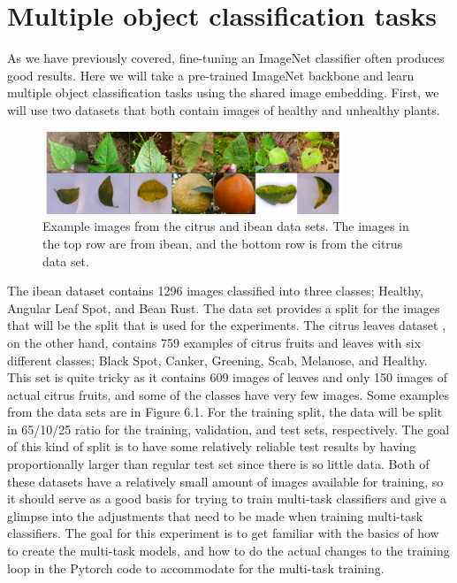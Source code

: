 \section{Multiple object classification tasks}
As we have previously covered, fine-tuning an ImageNet classifier often produces good results. 
Here we will take a pre-trained ImageNet backbone and learn multiple object classification tasks using the shared image embedding.
First, we will use two datasets that both contain images of healthy and unhealthy plants.

\begin{figure}[h!]
    \centering
    \includegraphics[width=0.8\textwidth]{imgs/citrus_beans_examples.png}
    \caption{Example images from the citrus and ibean data sets.
    The images in the top row are from ibean, and the bottom row is from the citrus data set.}
\end{figure}

The ibean dataset \citep{beansdata} contains 1296 images classified into three classes; Healthy, Angular Leaf Spot, and Bean Rust.
The data set provides a split for the images that will be the split that is used for the experiments.
The citrus leaves dataset \citep{citrusdata}, on the other hand, contains 759 examples of citrus fruits and leaves with six different classes; Black Spot, Canker, Greening, Scab, Melanose, and Healthy.
This set is quite tricky as it contains 609 images of leaves and only 150 images of actual citrus fruits, and some of the classes have very few images.
Some examples from the data sets are in Figure 6.1.
For the training split, the data will be split in 65/10/25 ratio for the training, validation, and test sets, respectively.
The goal of this kind of split is to have some relatively reliable test results by having proportionally larger than regular test set since there is so little data.
Both of these datasets have a relatively small amount of images available for training, so it should serve as a good basis for trying to train multi-task classifiers and give a glimpse into the adjustments that need to be made when training multi-task classifiers.
The goal for this experiment is to get familiar with the basics of how to create the multi-task models, and how to do the actual changes to the training loop in the Pytorch code to accommodate for the multi-task training.

